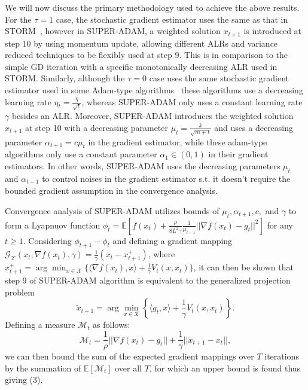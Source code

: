 \documentclass{article}
\begin{document}
We will now discuss the primary methodology used to achieve the above results. For the $\tau = 1$ case, the stochastic gradient estimator uses the same as that in STORM~\cite{https://doi.org/10.48550/arxiv.1905.10018}, however in SUPER-ADAM, a weighted solution $x_{t+1}$ is introduced at step 10 by
using momentum update, allowing different ALRs and variance reduced techniques to be flexibly used at step 9. This is in comparison to the simple GD iteration with a specific monotonically decreasing ALR used in STORM. Similarly, although the $\tau = 0$ case uses the
same stochastic gradient estimator used in some Adam-type algorithms~\cite{https://doi.org/10.48550/arxiv.1412.6980, https://doi.org/10.48550/arxiv.1904.09237, https://doi.org/10.48550/arxiv.2010.07468} these algorithms use a decreasing learning rate
$\eta_t = \frac{\eta}{\sqrt{t}}$, whereas SUPER-ADAM only uses a constant learning rate $\gamma$ besides an ALR. Moreover, SUPER-ADAM introduces the weighted solution $x_{t+1}$ at step 10 with a decreasing
parameter $\mu_t = \frac{k}{\sqrt{m+t}}$ and uses a decreasing parameter $\alpha_{t+1} = c\mu_t$ in the gradient estimator, while these adam-type algorithms only use a constant parameter $\alpha_1\in (0,1)$ in their gradient estimators. In other words, SUPER-ADAM uses the
decreasing parameters $\mu_t$ and $\alpha_{t+1}$ to control noises in the gradient estimator s.t. it doesn't require the bounded gradient assumption in the convergence analysis.

Convergence analysis of SUPER-ADAM utilizes bounds of $\mu_t, \alpha_{t+1}, c,$ and $\gamma$ to form a Lyapnuov function $\phi_t = \mathbb{E}[f(x_t) + \frac{\rho}{8L^2 \gamma}\frac{1}{\mu_{t-1}}||\nabla f(x_t) - g_t||^2]$ for any $t\geq 1$. Considering
$\phi_{t+1} - \phi_t$ and defining a gradient mapping $\mathcal{G}_{\mathcal{X}}(x_t, \nabla f(x_t),\gamma) = \frac{1}{\gamma}(x_t - x^+_{t+1})$, where $x^+_{t+1} = \arg\min_{x\in\mathcal{X}}\{\langle\nabla f(x_t), x\rangle + \frac{1}{\gamma} V_t(x,x_t)\}$,
it can then be shown that step 9 of SUPER-ADAM algorithm is equivalent to the generalized projection problem
\begin{equation}
	\tilde{x}_{t+1} = \arg\min_{x\in\mathcal{X}}\left\{\langle g_t, x\rangle + \frac{1}{\gamma}V_t (x,x_t)\right\}.
\end{equation}
Defining a measure $\mathcal{M}_t$ as follows:
\begin{equation}
	\mathcal{M}_t = \frac{1}{\rho}||\nabla f(x_t) - g_t|| + \frac{1}{\gamma}||\tilde{x}_{t+1} - x_t||,
\end{equation}
we can then bound the sum of the expected gradient mappings over $T$ iterations by the summation of $\mathbb{E}[\mathcal{M}_t]$ over all $T$, for which an upper bound is found thus giving (3).
\end{document}
